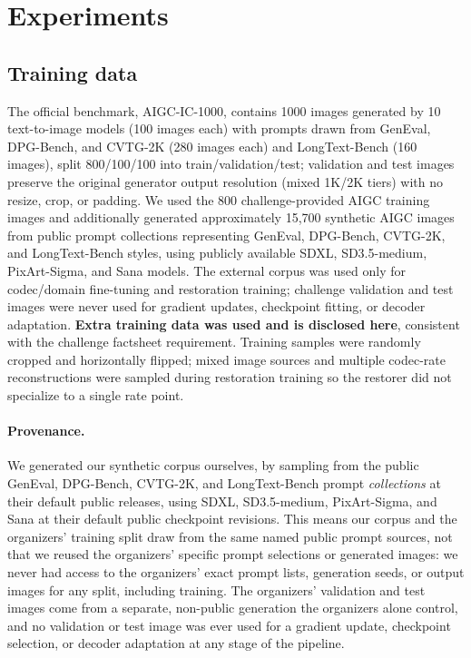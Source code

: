 \documentclass[runningheads]{llncs}
\begin{document}
\section{Experiments}
\subsection{Training data}
The official benchmark, AIGC-IC-1000, contains 1000 images generated by 10 text-to-image models (100 images each) with prompts drawn from GenEval, DPG-Bench, and CVTG-2K (280 images each) and LongText-Bench (160 images), split 800/100/100 into train/validation/test; validation and test images preserve the original generator output resolution (mixed 1K/2K tiers) with no resize, crop, or padding. We used the 800 challenge-provided AIGC training images and additionally generated approximately 15{,}700 synthetic AIGC images from public prompt collections representing GenEval, DPG-Bench, CVTG-2K, and LongText-Bench styles, using publicly available SDXL, SD3.5-medium, PixArt-Sigma, and Sana models. The external corpus was used only for codec/domain fine-tuning and restoration training; challenge validation and test images were never used for gradient updates, checkpoint fitting, or decoder adaptation. \textbf{Extra training data was used and is disclosed here}, consistent with the challenge factsheet requirement. Training samples were randomly cropped and horizontally flipped; mixed image sources and multiple codec-rate reconstructions were sampled during restoration training so the restorer did not specialize to a single rate point.

\paragraph{Provenance.} We generated our synthetic corpus ourselves, by sampling from the public GenEval, DPG-Bench, CVTG-2K, and LongText-Bench prompt \emph{collections} at their default public releases, using SDXL, SD3.5-medium, PixArt-Sigma, and Sana at their default public checkpoint revisions. This means our corpus and the organizers' training split draw from the same named public prompt sources, not that we reused the organizers' specific prompt selections or generated images: we never had access to the organizers' exact prompt lists, generation seeds, or output images for any split, including training. The organizers' validation and test images come from a separate, non-public generation the organizers alone control, and no validation or test image was ever used for a gradient update, checkpoint selection, or decoder adaptation at any stage of the pipeline.
\end{document}

